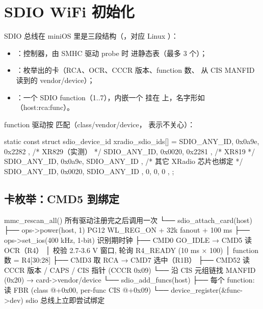 \section{SDIO WiFi 初始化}

SDIO 总线在 miniOS 里是三段结构（，对应 Linux
）：

\begin{itemize}
  \item {}：控制器，由 SMHC 驱动 probe 时 
        进静态表（最多 3 个）；
  \item {}：枚举出的卡（RCA、OCR、CCCR 版本、function 数、
        从 CIS MANFID 读到的 vendor/device）；
  \item {}：一个 SDIO function（1..7），内嵌一个
         挂在  上，名字形如
        （host:rca:func）。
\end{itemize}

function 驱动按  匹配（class/vendor/device，
表示不关心）：

\begin{ccode}
static const struct sdio_device_id xradio_sdio_ids[] = {
    { SDIO_ANY_ID, 0x0a9e, 0x2282 },        /* XR829（实测） */
    { SDIO_ANY_ID, 0x0020, 0x2281 },        /* XR819 */
    { SDIO_ANY_ID, 0x0a9e, SDIO_ANY_ID },   /* 其它 XRadio 芯片也绑定 */
    { SDIO_ANY_ID, 0x0020, SDIO_ANY_ID },
    { 0, 0, 0 },
};
\end{ccode}

\subsection{卡枚举：CMD5 到绑定}

\begin{txtcode}
mmc_rescan_all()                        所有驱动注册完之后调用一次
└── sdio_attach_card(host)
    ├── ops->power(host, 1)             PG12 WL_REG_ON + 32k fanout + 100 ms
    ├── ops->set_ios(400 kHz, 1-bit)    识别期时钟
    ├── CMD0 GO_IDLE → CMD5 读 OCR（R4）
    │     校验 2.7-3.6 V 窗口, 轮询 R4_READY (10 ms × 100)
    │     function 数 = R4[30:28]
    ├── CMD3 取 RCA → CMD7 选中（R1B）
    ├── CMD52 读 CCCR 版本 / CAPS / CIS 指针 (CCCR 0x09)
    └── 沿 CIS 元组链找 MANFID (0x20) → card->vendor/device
└── sdio_add_funcs(host)
    ├── 每个 function: 读 FBR (class @+0x00, per-func CIS @+0x09)
    └── device_register(&func->dev)     sdio 总线上立即尝试绑定
\end{txtcode}


